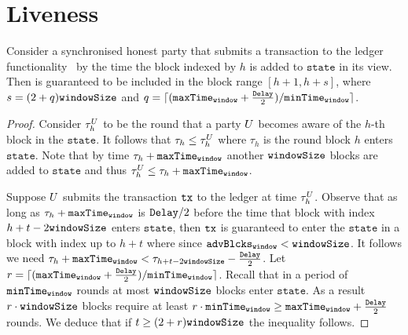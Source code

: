 \section{Liveness}
\label{sec:liveness}

\begin{proposition}
  \label{prop:liveness}
  Consider a synchronised honest party that submits a transaction \tx to the
  ledger functionality~\cite{genesis} by the time the block indexed by $h$ is
  added to $\texttt{state}$ in its view. Then \tx is guaranteed to be included
  in the block range $[h+1, h + s]$, where $s = (2 + q) \texttt{windowSize}$ and $q = \lceil
  (\texttt{maxTime}_\texttt{window} + \frac{\texttt{Delay}}{2})/ \texttt{minTime}_\texttt{window} \rceil$.
\end{proposition}

\begin{proof}
  Consider $\tau^{U}_h$ to be the round that a party $U$ becomes aware
  of the $h$-th block in the $\texttt{state}$. It follows that $\tau_h \leq
  \tau^{U}_h$ where $\tau_h$ is the round block $h$ enters $\texttt{state}$. Note
  that by time $\tau_h + \texttt{maxTime}_\texttt{window}$ another $\texttt{windowSize}$ blocks are added to
  $\texttt{state}$ and thus $\tau^{U}_h \leq \tau_h + \texttt{maxTime}_\texttt{window}$.

  Suppose $U$ submits the transaction $\texttt{tx}$ to the ledger at time
  $\tau^{U}_h$. Observe that as long as $\tau_h + \texttt{maxTime}_\texttt{window}$ is $\texttt{Delay}/2$
  before the time that block with index $h + t - 2\texttt{windowSize}$ enters $\texttt{state}$,
  then $\texttt{tx}$ is guaranteed to enter the $\texttt{state}$ in a block with index up to $h
  + t$ where since $\texttt{advBlcks}_\texttt{window} < \texttt{windowSize}$. It follows we need
  $\tau_h + \texttt{maxTime}_\texttt{window} < \tau_{h + t - 2\texttt{windowSize}} - \frac{\texttt{Delay}}{2}$. Let $r
  = \lceil (\texttt{maxTime}_\texttt{window} + \frac{\texttt{Delay}}{2})/ \texttt{minTime}_\texttt{window} \rceil$. Recall that in a
  period of $\texttt{minTime}_\texttt{window}$ rounds at most $\texttt{windowSize}$ blocks enter $\texttt{state}$. As a
  result $r \cdot \texttt{windowSize}$ blocks require at least $r \cdot \texttt{minTime}_\texttt{window} \geq
  \texttt{maxTime}_\texttt{window} + \frac{\texttt{Delay}}{2}$ rounds. We deduce that if $t \geq (2 +
  r)\texttt{windowSize}$ the inequality follows.
\end{proof}
